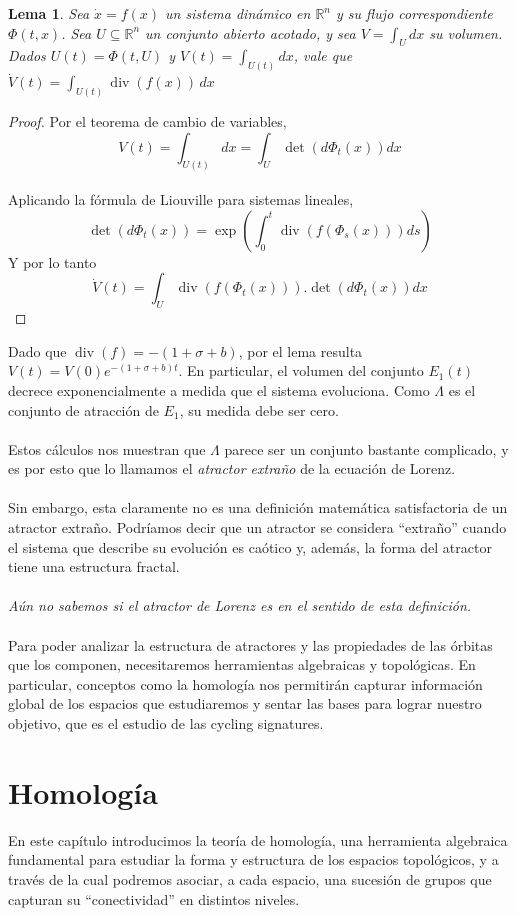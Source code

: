 \documentclass[12pt,a4paper]{article}
\newtheorem{lemma}[theorem]{Lema}
\begin{document}
\begin{lemma}    
Sea $\dot{x} = f(x)$ un sistema dinámico en $\mathbb{R}^n$ y su flujo correspondiente $\Phi(t,x)$. Sea $U \subseteq \mathbb{R}^n$ un conjunto abierto acotado, y sea $V=\int_{U}dx$ su volumen. Dados $U(t) = \Phi(t,U)$ y $V(t)=\int_{U(t)}dx$, vale que $\displaystyle \dot{V}(t)=\int_{U(t)}\operatorname{div}(f(x)) \, dx$
\end{lemma}
\begin{proof}
Por el teorema de cambio de variables,
\[
V(t) = \int_{U(t)}dx = \int_U\det(d\Phi_t(x))dx
\]
\\
Aplicando la fórmula de Liouville para sistemas lineales,
\[
\det(d\Phi_t(x)) = \exp(\int_0^t\operatorname{div}(f(\Phi_s(x)))ds)
\]
Y por lo tanto
\[
\dot{V}(t) = \int_U\operatorname{div}(f(\Phi_t(x))).\det(d\Phi_t(x))dx
\]  
\end{proof}
Dado que $\operatorname{div}(f) = -(1 + \sigma + b)$, por el lema resulta $V(t) = V(0)e^{-(1+\sigma+b)t}$. En particular, el volumen del conjunto $E_1(t)$ decrece exponencialmente a medida que el sistema evoluciona. Como $\Lambda$ es el conjunto de atracción de $E_1$, su medida debe ser cero.
\\
\\
Estos cálculos nos muestran que $\Lambda$ parece ser un conjunto bastante complicado, y es por esto que lo llamamos el \textit{atractor extraño} de la ecuación de Lorenz.
\\
\\
Sin embargo, esta claramente no es una definición matemática satisfactoria de un atractor extraño. Podríamos decir que un atractor se considera ``extraño'' cuando el sistema que describe su evolución es caótico y, además, la forma del atractor tiene una estructura fractal.
\\
\\
\textit{Aún no sabemos si el atractor de Lorenz es  en el sentido de esta definición.}
\\
\\
Para poder analizar la estructura de atractores y las propiedades de las órbitas que los componen, necesitaremos herramientas algebraicas y topológicas. En particular, conceptos como la homología nos permitirán capturar información global de los espacios que estudiaremos y sentar las bases para lograr nuestro objetivo, que es el estudio de las cycling signatures.
\section{Homología}
En este capítulo introducimos la teoría de homología, una herramienta algebraica fundamental para estudiar la forma y estructura de los espacios topológicos, y a través de la cual podremos asociar, a cada espacio, una sucesión de grupos que capturan su ``conectividad'' en distintos niveles. 
\end{document}
